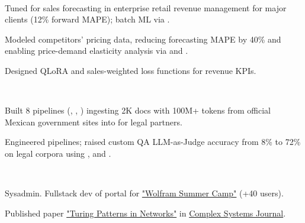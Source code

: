 \documentclass{tex/deedy-resume-openfont}
\begin{document}
\begin{minipage}[t]{0.67\textwidth}
\\
\begin{tightemize}
    \item Tuned   for sales forecasting in enterprise retail revenue management for major clients (12\% forward MAPE);  batch ML via .
    \item Modeled competitors' pricing data, reducing forecasting MAPE by 40\% and enabling price-demand elasticity analysis via  and .
    \item Designed QLoRA and sales-weighted loss functions for revenue KPIs.
\end{tightemize}
\sectionsep

\\
\begin{tightemize}
    \item Built 8  pipelines (, , ) ingesting 2K docs with 100M+ tokens from official Mexican government sites into  for legal partners.
    \item Engineered  pipelines; raised custom QA LLM-as-Judge accuracy from 8\% to 72\% on legal corpora using ,  and .
\end{tightemize}
\sectionsep

\\
\begin{tightemize}
    \item Sysadmin. Fullstack dev of portal for \href{https://www.notebookarchive.org/collection-pod?collection=wolfram-summer-school-2021}{"Wolfram Summer Camp"} (+40 users).
    \item Published paper \href{https://www.complex-systems.com/abstracts/v32_i03_a02/}{"Turing Patterns in Networks"} in \href{https://www.complex-systems.com/}{Complex Systems Journal}.
\end{tightemize}
\sectionsep


\end{minipage}
\end{document}
